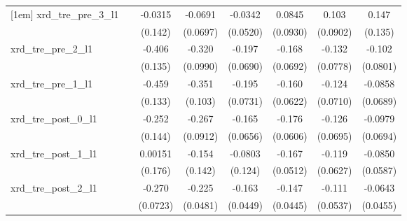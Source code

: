 {\begin{tabular}{l*{7}{c}}
[1em]
xrd\_tre\_pre\_3\_l1&                     &     -0.0315         &     -0.0691         &     -0.0342         &      0.0845         &       0.103         &       0.147         \\
            &                     &     (0.142)         &    (0.0697)         &    (0.0520)         &    (0.0930)         &    (0.0902)         &     (0.135)         \\
[1em]
xrd\_tre\_pre\_2\_l1&                     &      -0.406\sym{**} &      -0.320\sym{**} &      -0.197\sym{**} &      -0.168\sym{*}  &      -0.132         &      -0.102         \\
            &                     &     (0.135)         &    (0.0990)         &    (0.0690)         &    (0.0692)         &    (0.0778)         &    (0.0801)         \\
[1em]
xrd\_tre\_pre\_1\_l1&                     &      -0.459\sym{**} &      -0.351\sym{**} &      -0.195\sym{*}  &      -0.160\sym{*}  &      -0.124         &     -0.0858         \\
            &                     &     (0.133)         &     (0.103)         &    (0.0731)         &    (0.0622)         &    (0.0710)         &    (0.0689)         \\
[1em]
xrd\_tre\_post\_0\_l1&                     &      -0.252         &      -0.267\sym{**} &      -0.165\sym{*}  &      -0.176\sym{**} &      -0.126         &     -0.0979         \\
            &                     &     (0.144)         &    (0.0912)         &    (0.0656)         &    (0.0606)         &    (0.0695)         &    (0.0694)         \\
[1em]
xrd\_tre\_post\_1\_l1&                     &     0.00151         &      -0.154         &     -0.0803         &      -0.167\sym{**} &      -0.119         &     -0.0850         \\
            &                     &     (0.176)         &     (0.142)         &     (0.124)         &    (0.0512)         &    (0.0627)         &    (0.0587)         \\
[1em]
xrd\_tre\_post\_2\_l1&                     &      -0.270\sym{***}&      -0.225\sym{***}&      -0.163\sym{***}&      -0.147\sym{**} &      -0.111\sym{*}  &     -0.0643         \\
            &                     &    (0.0723)         &    (0.0481)         &    (0.0449)         &    (0.0445)         &    (0.0537)         &    (0.0455)         \\
[1em]

\end{tabular}}

